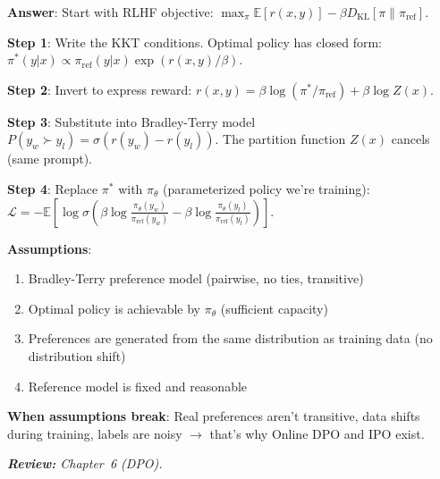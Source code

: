 \begin{questionbox}
\textbf{Answer}: Start with RLHF objective: $\max_\pi \mathbb{E}[r(x,y)] - \beta D_\text{KL}[\pi\|\pi_\text{ref}]$.

\textbf{Step 1}: Write the KKT conditions. Optimal policy has closed form: $\pi^*(y|x) \propto \pi_\text{ref}(y|x)\exp(r(x,y)/\beta)$.

\textbf{Step 2}: Invert to express reward: $r(x,y) = \beta\log(\pi^*/\pi_\text{ref}) + \beta\log Z(x)$.

\textbf{Step 3}: Substitute into Bradley-Terry model $P(y_w \succ y_l) = \sigma(r(y_w) - r(y_l))$. The partition function $Z(x)$ cancels (same prompt).

\textbf{Step 4}: Replace $\pi^*$ with $\pi_\theta$ (parameterized policy we’re training): $\mathcal{L} = -\mathbb{E}[\log\sigma(\beta\log\frac{\pi_\theta(y_w)}{\pi_\text{ref}(y_w)} - \beta\log\frac{\pi_\theta(y_l)}{\pi_\text{ref}(y_l)})]$.

\textbf{Assumptions}:

\begin{enumerate}
  \item Bradley-Terry preference model (pairwise, no ties, transitive)
  \item Optimal policy is achievable by $\pi_\theta$ (sufficient capacity)
  \item Preferences are generated from the same distribution as training data (no distribution shift)
  \item Reference model is fixed and reasonable
\end{enumerate}

\textbf{When assumptions break}: Real preferences aren’t transitive, data shifts during training, labels are noisy $\rightarrow$ that’s why Online DPO and IPO exist.

\emph{\textbf{Review:} Chapter~6 (DPO).}
\end{questionbox}

